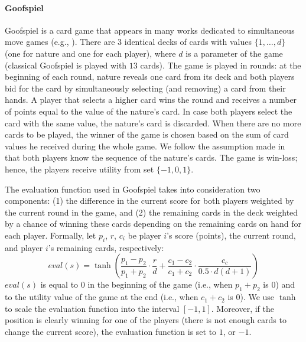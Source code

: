 \paragraph{\textbf{Goofspiel}}
Goofspiel is a card game that appears in many works dedicated to simultaneous move games (e.g., \cite{Saffidine12SMAB,Rhoads12Computer,Lanctot13Goofspiel}). 
There are $3$ identical decks of cards with values $\{1,\dots, d\}$ (one for nature and one for each player), where $d$ is a parameter of the game (classical Goofspiel is played with $13$ cards). 
The game is played in rounds: at the beginning of each round, nature reveals one card from its deck and both players bid for the card by simultaneously selecting (and removing) a card from their hands. 
A player that selects a higher card wins the round and receives a number of points equal to the value of the nature's card. In case both players select the card with the same value, the nature's card is discarded. 
When there are no more cards to be played, the winner of the game is chosen based on the sum of card values he received during the whole game. 
We follow the assumption made in \cite{Saffidine12SMAB} that both players know the sequence of the nature's cards. 
The game is win-loss; hence, the players receive utility from set $\lbrace -1, 0, 1 \rbrace$.

The evaluation function used in Goofspiel takes into consideration two components: (1) the difference in the current score for both players weighted by the current round in the game, and (2) the remaining cards in the deck weighted by a chance of winning these cards depending on the remaining cards on hand for each player. Formally, let $p_i$, $r$, $c_i$ be player $i$'s score (points), the current round, and player $i$'s remaining cards, respectively:
$$
eval(s) = \tanh\left(\frac{p_1 - p_2}{p_1 + p_2}\cdot\frac{r}{d} + \frac{c_1 - c_2}{c_1 + c_2}\cdot\frac{c_c}{0.5 \cdot d(d+1)}\right)
$$
$eval(s)$ is equal to $0$ in the beginning of the game (i.e., when $p_1 + p_2$ is $0$) and to the utility value of the game at the end (i.e., when $c_1 + c_2$ is $0$). We use $\tanh$ to scale the evaluation function into the interval $[-1,1]$.
Moreover, if the position is clearly winning for one of the players (there is not enough cards to change the current score), the evaluation function is set to $1$, or $-1$.
